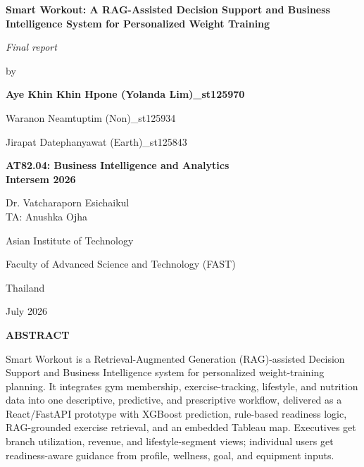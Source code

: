 \documentclass{aitthesis}
\newcommand{\reporttitle}{Smart Workout: A RAG-Assisted Decision Support and
Business Intelligence System for Personalized Weight Training}
\newcommand{\studentname}{Aye Khin Khin Hpone (Yolanda Lim)}
\newcommand{\studentid}{st125970}
\newcommand{\studentnameii}{Waranon Neamtuptim (Non)}
\newcommand{\studentidii}{st125934}
\newcommand{\studentnameiii}{Jirapat Datephanyawat (Earth)}
\newcommand{\studentidiii}{st125843}
\newcommand{\degreeprogram}{AT82.04: Business Intelligence and Analytics \\
Intersem 2026}
\newcommand{\submissiondate}{July 2026}
\begin{document}
\begin{titlepage}
\thispagestyle{empty}
\singlespacing
\centering

{\bfseries\Large \reporttitle\par}
\vspace{0.45in}

\textit{Final report}

{by\par}
\vspace{0.20in}

{\bfseries
\studentname\_\studentid\par
\studentnameii\_\studentidii\par
\studentnameiii\_\studentidiii\par
}

\vspace{0.42in}

\begin{minipage}{0.82\textwidth}
\centering


\textbf{\degreeprogram}
\end{minipage}
\vspace{0.42in}

Dr. Vatcharaporn Esichaikul\\
TA: Anushka Ojha

\vfill
{Asian Institute of Technology\par}
{Faculty of Advanced Science and Technology (FAST)\par}
{Thailand\par}
{\submissiondate\par}
\end{titlepage}


{}
\begin{center}
    \large{\bf ABSTRACT}
\end{center}


Smart Workout is a Retrieval-Augmented Generation (RAG)-assisted Decision Support and Business Intelligence system for personalized weight-training planning. It integrates gym membership, exercise-tracking, lifestyle, and nutrition data into one descriptive, predictive, and prescriptive workflow, delivered as a React/FastAPI prototype with XGBoost prediction, rule-based readiness logic, RAG-grounded exercise retrieval, and an embedded Tableau map. Executives get branch utilization, revenue, and lifestyle-segment views; individual users get readiness-aware guidance from profile, wellness, goal, and equipment inputs.
\end{document}
